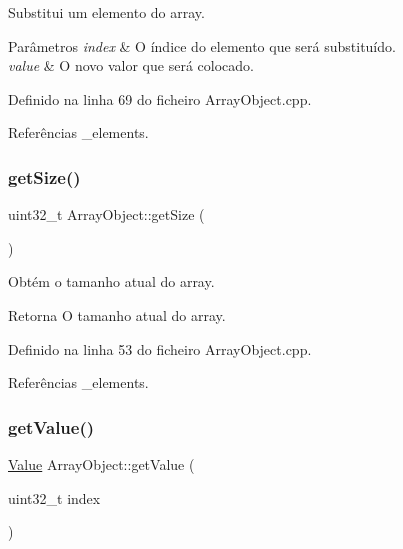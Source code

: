 Substitui um elemento do array. 


\begin{DoxyParams}{Parâmetros}
{\em index} & O índice do elemento que será substituído. \\
\hline
{\em value} & O novo valor que será colocado. \\
\hline
\end{DoxyParams}


Definido na linha 69 do ficheiro Array\+Object.\+cpp.



Referências \+\_\+elements.

\mbox{\label{classArrayObject_af43b8f4106c2f15def7fecd3e3f6b239}} 
\subsubsection{\texorpdfstring{get\+Size()}{getSize()}}
{\footnotesize\ttfamily uint32\+\_\+t Array\+Object\+::get\+Size (\begin{DoxyParamCaption}{ }\end{DoxyParamCaption})}



Obtém o tamanho atual do array. 

\begin{DoxyReturn}{Retorna}
O tamanho atual do array. 
\end{DoxyReturn}


Definido na linha 53 do ficheiro Array\+Object.\+cpp.



Referências \+\_\+elements.

\mbox{\label{classArrayObject_a468341ed2c683c3152a0ea58b2094c0f}} 
\subsubsection{\texorpdfstring{get\+Value()}{getValue()}}
{\footnotesize\ttfamily \hyperlink{structValue}{Value} Array\+Object\+::get\+Value (\begin{DoxyParamCaption}\item[{uint32\+\_\+t}]{index }\end{DoxyParamCaption})}



